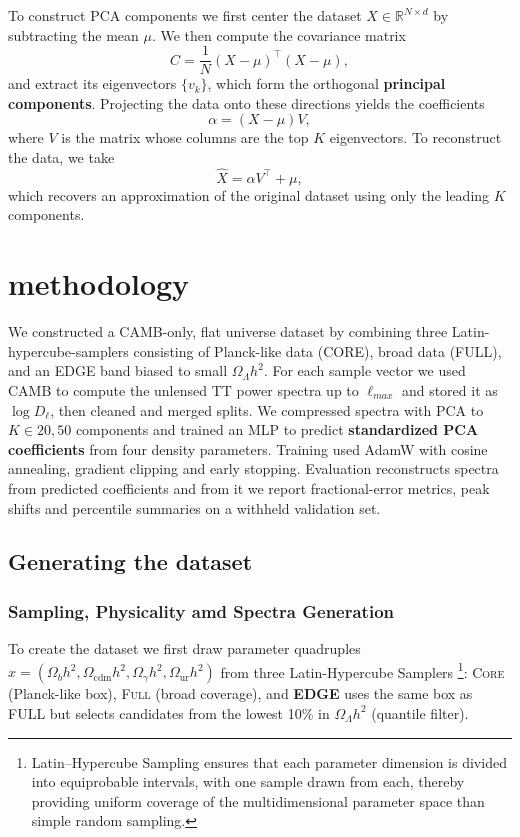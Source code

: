 \documentclass[11pt,a4paper]{article}
\numberwithin{equation}{section}
\begin{document}
To construct PCA components we first center the dataset $X \in \mathbb{R}^{N \times d}$ by subtracting the mean $\mu$.
We then compute the covariance matrix 
\[
C = \frac{1}{N} (X - \mu)^\top (X - \mu),
\]
and extract its eigenvectors $\{v_k\}$, which form the orthogonal \textbf{principal components}. 
Projecting the data onto these directions yields the coefficients
\[
\alpha = (X - \mu)V,
\]
where $V$ is the matrix whose columns are the top $K$ eigenvectors. To reconstruct the data, we take
\[
\hat{X} = \alpha V^\top + \mu,
\]
which recovers an approximation of the original dataset using only the leading $K$ components.

\section{methodology}
\label{sec:methods}


We constructed a CAMB-only, flat universe dataset by combining three Latin-hypercube-samplers consisting of Planck-like data (CORE), broad data (FULL), and an EDGE band biased to small $\Omega_{\Lambda} h^2$. 
For each sample vector we used CAMB to compute the unlensed TT power spectra up to $\ell_{max}$ and stored it as $\log D_\ell$, then cleaned and merged splits. 
We compressed spectra with PCA to $K \in {20, 50}$ components and trained an MLP to predict \textbf{standardized PCA coefficients} from four density parameters. 
Training used AdamW with cosine annealing, gradient clipping and early stopping. 
Evaluation reconstructs spectra from predicted coefficients and from it we report fractional-error metrics, peak shifts and percentile summaries on a withheld validation set. 

\subsection{Generating the dataset}
\label{sec:data-gen}

\subsubsection{Sampling, Physicality amd Spectra Generation}
\label{sec:data-gen}

To create the dataset we first draw parameter quadruples $x=(\Omega_b h^2,\Omega_{\mathrm{cdm}} h^2,\Omega_\gamma h^2,\Omega_{\mathrm{ur}} h^2)$ 
from three Latin-Hypercube Samplers \footnote{Latin–Hypercube Sampling ensures that each parameter dimension is divided into equiprobable intervals, with one sample drawn from each, thereby providing uniform coverage of the multidimensional parameter space than simple random sampling.}: \textsc{Core} (Planck-like box), \textsc{Full} (broad coverage), and \textbf{EDGE} uses the same box as FULL but selects candidates from the lowest 10\% in $\Omega_\Lambda h^2$ (quantile filter).
\end{document}
